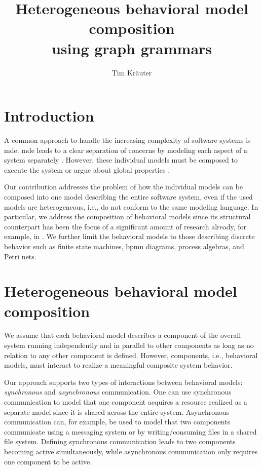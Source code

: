 \documentclass[a4paper]{easychair}
\title{Heterogeneous behavioral model composition \\
        using graph grammars}
\author{
Tim Kräuter
}
\institute{
  Høgskulen på Vestlandet\\
  Bergen, Norway\\
  \email{tkra@hvl.no}
 }
\begin{document}
\maketitle

\section{Introduction}
A common approach to handle the increasing complexity of software systems is \gls{mde}.
\gls{mde} leads to a clear separation of concerns by modeling each aspect of a system separately \cite{franceModeldrivenDevelopmentComplex2007}.
However, these individual models must be composed to execute the system or argue about global properties \cite{kienzleUnifyingFrameworkHomogeneous2019}.

Our contribution addresses the problem of how the individual models can be composed into one model describing the entire software system, even if the used models are heterogeneous, i.e., do not conform to the same modeling language.
In particular, we address the composition of behavioral models since its structural counterpart has been the focus of a significant amount of research already, for example, in \cite{kienzleUnifyingFrameworkHomogeneous2019, klareCommonalitiesPreservingConsistency2019, stunkelComprehensiveSystemsFormal2021}.
We further limit the behavioral models to those describing discrete behavior such as finite state machines, \gls{bpmn} diagrams, process algebras, and Petri nets. %

\section{Heterogeneous behavioral model composition}
We assume that each behavioral model describes a component of the overall system running independently and in parallel to other components as long as no relation to any other component is defined.
However, components, i.e., behavioral models, must interact to realize a meaningful composite system behavior.

Our approach supports two types of interactions between behavioral models: \textit{synchronous} and \textit{asynchronous} communication.
One can use synchronous communication to model that one component acquires a resource realized as a separate model since it is shared across the entire system.
Asynchronous communication can, for example, be used to model that two components communicate using a messaging system or by writing/consuming files in a shared file system.
Defining synchronous communication leads to two components becoming active simultaneously, while asynchronous communication only requires one component to be active. 
\end{document}
